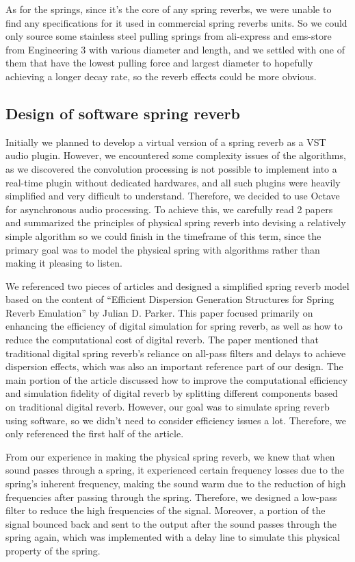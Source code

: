 \documentclass[12pt]{article}
\begin{document}
As for the springs, since it's the core of any spring reverbs, we were unable to find any specifications for it used in commercial spring reverbs units. So we could only source some stainless steel pulling springs from ali-express and ems-store from Engineering 3 with various diameter and length, and we settled with one of them that have the lowest pulling force and largest diameter to hopefully achieving a longer decay rate, so the reverb effects could be more obvious.

\subsection{Design of software spring reverb}

Initially we planned to develop a virtual version of a spring reverb as a VST audio plugin. However, we encountered some complexity issues of the algorithms, as we discovered the convolution processing is not possible to implement into a real-time plugin without dedicated hardwares, and all such plugins were heavily simplified and very difficult to understand. Therefore, we decided to use Octave for asynchronous audio processing. To achieve this, we carefully read 2 papers and summarized the principles of physical spring reverb into devising a relatively simple algorithm so we could finish in the timeframe of this term, since the primary goal was to model the physical spring with algorithms rather than making it pleasing to listen. 

We referenced two pieces of articles and designed a simplified spring reverb model based on the content of ``Efficient Dispersion Generation Structures for Spring Reverb Emulation'' by Julian D. Parker. This paper focused primarily on enhancing the efficiency of digital simulation for spring reverb, as well as how to reduce the computational cost of digital reverb. The paper mentioned that traditional digital spring reverb's reliance on all-pass filters and delays to achieve dispersion effects, which was also an important reference part of our design. The main portion of the article discussed how to improve the computational efficiency and simulation fidelity of digital reverb by splitting different components based on traditional digital reverb. However, our goal was to simulate spring reverb using software, so we didn't need to consider efficiency issues a lot. Therefore, we only referenced the first half of the article.

From our experience in making the physical spring reverb, we knew that when sound passes through a spring, it experienced certain frequency losses due to the spring's inherent frequency, making the sound warm due to the reduction of high frequencies after passing through the spring. Therefore, we designed a low-pass filter to reduce the high frequencies of the signal. Moreover, a portion of the signal bounced back and sent to the output after the sound passes through the spring again, which was implemented with a delay line to simulate this physical property of the spring.
\end{document}
